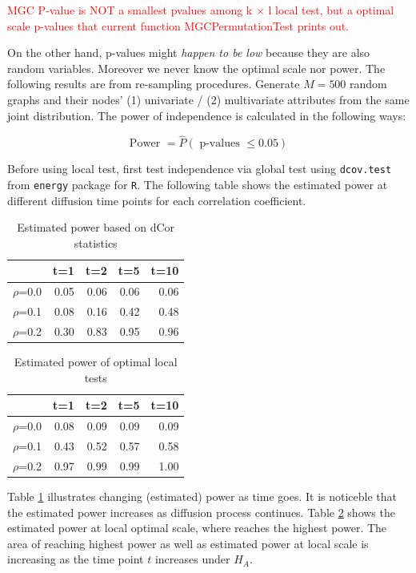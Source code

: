 \documentclass[12pt]{report}
\begin{document}
\textcolor{red}{MGC P-value is NOT a smallest pvalues among k $\times$ l local test, but a optimal scale p-values that current function MGCPermutationTest prints out.}

\newpage
On the other hand, p-values might \textit{happen to be low} because they are also random variables. Moreover we never know the optimal scale nor power. The following results are from re-sampling procedures. Generate $M=500$ random graphs and their nodes' (1) univariate / (2) multivariate attributes from the same joint distribution. The power of independence is calculated in the following ways:

$$\mbox{Power } = \hat{P}(\mbox{ p-values } \leq 0.05)$$

Before using local test, first test independence via global test using \verb!dcov.test! from \verb!energy! package for \verb!R!. The following table shows the estimated power at different diffusion time points for each correlation coefficient. 

\begin{table}[ht]
\centering
\begin{tabular}{rrrrr}
  \hline
 & t=1 & t=2 & t=5 & t=10 \\ 
  \hline
$\rho$=0.0 & 0.05 & 0.06 & 0.06 & 0.06 \\ 
  $\rho$=0.1 & 0.08 & 0.16 & 0.42 & 0.48 \\ 
  $\rho$=0.2 & 0.30 & 0.83 & 0.95 & 0.96 \\ 
   \hline
\end{tabular}
\caption{Estimated power based on dCor statistics}
\label{tab:dcor}
\end{table}


\begin{table}[ht]
\centering
\begin{tabular}{rrrrr}
  \hline
 & t=1 & t=2 & t=5 & t=10 \\ 
  \hline
$\rho$=0.0 & 0.08 & 0.09 & 0.09 & 0.09 \\ 
  $\rho$=0.1 & 0.43 & 0.52 & 0.57 & 0.58 \\ 
  $\rho$=0.2 & 0.97 & 0.99 & 0.99 & 1.00 \\ 
   \hline
\end{tabular}
\caption{Estimated power of optimal local tests}
\label{tab:local}
\end{table}


Table \ref{tab:dcor} illustrates changing (estimated) power as time goes. It is noticeble that the estimated power increases as diffusion process continues. Table \ref{tab:local} shows the estimated power at local optimal scale, where reaches the highest power. The area of reaching highest power as well as estimated power at local scale is increasing as the time point $t$ increases under $H_{A}.$ 
\end{document}

